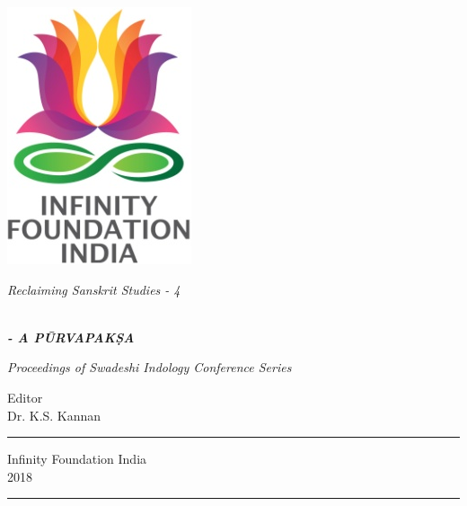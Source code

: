 \thispagestyle{empty}
\begin{center}
\includegraphics[scale=0.3]{figures/logo.png}
\bigskip

{\fontsize{10}{14}\selectfont\sl
Reclaiming Sanskrit Studies - 4}

\bigskip
\end{center}
\medskip

\begin{center}
{\fontsize{20}{24}}\\[10pt]
{\sl\bfseries{}\fontsize{20}{24}\selectfont - A PŪRVAPAKṢA}
\bigskip

{\sl\small Proceedings of Swadeshi Indology Conference Series}

\vfill


{\fontsize{14}{18}\selectfont 
Editor\\
Dr. K.S. Kannan\par
}
\vfill

\rule{5cm}{1pt}

{\fontsize{12}{14}\selectfont
Infinity Foundation India\\[4pt]
2018}

\rule{5cm}{1pt}
\end{center}




